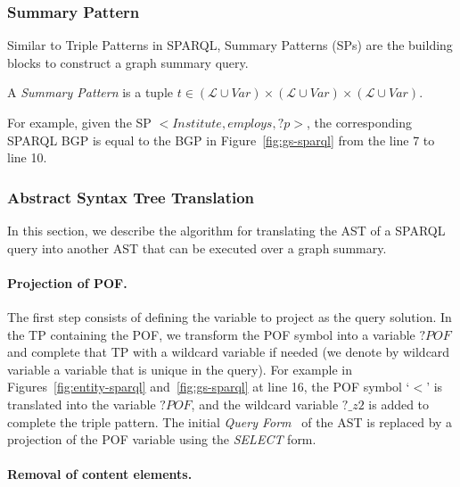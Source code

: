 \subsubsection{Summary Pattern}

Similar to Triple Patterns in SPARQL, Summary Patterns (SPs) are the building blocks to construct a graph summary query.

\begin{definition}
	A \emph{Summary Pattern} is a tuple $t \in  (\mathcal{L} \cup Var) \times (\mathcal{L} \cup Var) \times (\mathcal{L} \cup Var)$.
	\label{def:summary-triple-pattern}
\end{definition}

For example, given the SP \mbox{$<Institute, employs, ?p>$}, the corresponding SPARQL BGP is equal to the BGP in Figure~\ref{fig:gs-sparql} from the line 7 to line 10.

\subsubsection{Abstract Syntax Tree Translation}

In this section, we describe the algorithm for translating the AST of a SPARQL query into another AST that can be executed over a graph summary.

\paragraph{Projection of POF.}

The first step consists of defining the variable to project as the query solution. In the TP containing the POF, we transform the POF symbol into a variable $?POF$ and complete that TP with a wildcard variable if needed (we denote by wildcard variable a variable that is unique in the query). For example in Figures~\ref{fig:entity-sparql} and~\ref{fig:gs-sparql} at line 16, the POF symbol `$<$' is translated into the variable $?POF$, and the wildcard variable $?\_z2$ is added to complete the triple pattern.
The initial \emph{Query Form}~\cite{PrudS08} of the AST is replaced by a projection of the POF variable using the \emph{SELECT} form.

\paragraph{Removal of content elements.}

